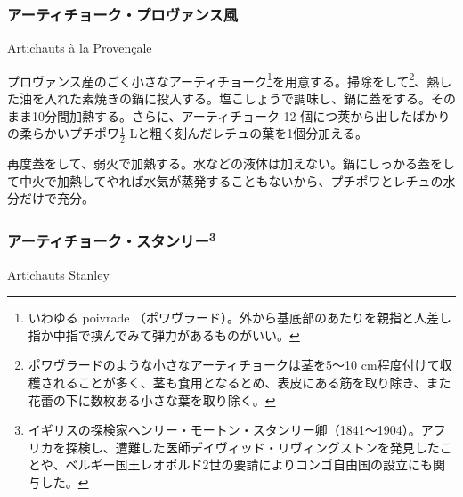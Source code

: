 \begin{recette}
{\subsubsection{アーティチョーク・プロヴァンス風}\label{artichauts-a-la-provencale}}


\begin{frsubenv}

Artichauts à la Provençale

\end{frsubenv}

プロヴァンス産のごく小さなアーティチョーク\footnote{いわゆる poivrade
  （ポワヴラード）。外から基底部のあたりを親指と人差し指か中指で挟んでみて弾力があるものがいい。}を用意する。掃除をして\footnote{ポワヴラードのような小さなアーティチョークは茎を5〜10
  cm程度付けて収穫されることが多く、茎も食用となるとめ、表皮にある筋を取り除き、また花蕾の下に数枚ある小さな葉を取り除く。}、熱した油を入れた素焼きの鍋に投入する。塩こしょうで調味し、鍋に蓋をする。そのまま10分間加熱する。さらに、アーティチョーク
12 個につ莢から出したばかりの柔らかいプチポワ\(\frac{1}{2}\)
Lと粗く刻んだレチュの葉を1個分加える。

再度蓋をして、弱火で加熱する。水などの液体は加えない。鍋にしっかる蓋をして中火で加熱してやれば水気が蒸発することもないから、プチポワとレチュの水分だけで充分。

\atoaki{}

\hypertarget{artichauts-stanley}{%
\subsubsection[アーティチョーク・スタンリー]{\texorpdfstring{アーティチョーク・スタンリー\footnote{イギリスの探検家ヘンリー・モートン・スタンリー卿（1841〜1904）。アフリカを探検し、遭難した医師デイヴィッド・リヴィングストンを発見したことや、ベルギー国王レオポルド2世の要請によりコンゴ自由国の設立にも関与した。}}{アーティチョーク・スタンリー}}\label{artichauts-stanley}}

\begin{frsubenv}

Artichauts Stanley

\end{frsubenv}


\end{recette}
